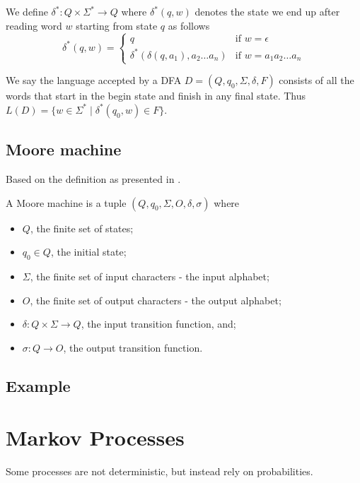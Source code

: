 \begin{definition}
We define $\delta^*:Q\times\Sigma^*\to Q$ where $\delta^*(q,w)$ denotes the state we end up after reading word $w$ starting from state $q$ as follows
\begin{equation*}
\delta^*(q,w)=\begin{cases}
	q &\text{if } w=\epsilon \\
	\delta^*(\delta(q,a_1),a_2\dots a_n) & \text{if } w=a_1a_2\dots a_n
	\end{cases}
\end{equation*}
\label{d:delta_star}
\end{definition}

\begin{definition}
We say the language accepted by a DFA $D=(Q,q_0,\Sigma,\delta,F)$ consists of all the words that start in the begin state and finish in any final state. Thus $L(D)=\{w\in\Sigma^*\mid \delta^*(q_0,w)\in F\}$.
\label{d:accepted_language}
\end{definition}


\subsection{Moore machine}
Based on the definition as presented in \cite{p:moore}.
\begin{definition}
	A Moore machine is a tuple $(Q,q_0,\Sigma,O,\delta,\sigma)$ where
	\begin{itemize}
		\item $Q$, the finite set of states;
		\item $q_0\in Q$, the initial state;
		\item $\Sigma$, the finite set of input characters - the input alphabet;
		\item $O$, the finite set of output characters - the output alphabet;
		\item $\delta: Q\times \Sigma\to Q$, the input transition function, and;
		\item $\sigma : Q\to O$, the output transition function.
	\end{itemize}
\end{definition}
\subsection*{Example}

\section{Markov Processes}
Some processes are not deterministic, but instead rely on probabilities.

